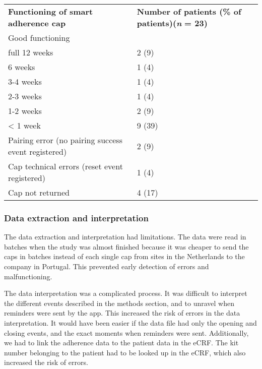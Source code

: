 \documentclass{article}
\begin{document}
\begin{table}

  
\begin{tabular}{l  l}

  \textbf{Functioning of smart adherence cap} & \textbf{Number of patients (\% of patients)}\textbf{(}\emph{\textbf{n}}\textbf{ = 23)}\\
Good functioning & \\
 full 12 weeks &  2 (9)\\
 6 weeks &  1 (4)\\
 3-4 weeks &  1 (4)\\
 2-3 weeks &  1 (4)\\
 1-2 weeks &  2 (9)\\
 < 1 week &  9 (39)\\
Pairing error (no pairing success event registered) &  2 (9)\\
Cap technical errors (reset event registered) &  1 (4)\\
Cap not returned &  4 (17)\\


\end{tabular}


\end{table}


\subsubsection{Data extraction and interpretation}

The data extraction and interpretation had limitations. The data were read in batches when the study was almost finished because it was cheaper to send the caps in batches instead of each single cap from sites in the Netherlands to the company in Portugal. This prevented early detection of errors and malfunctioning. 



The data interpretation was a complicated process. It was difficult to interpret the different events described in the methods section, and to unravel when reminders were sent by the app. This increased the risk of errors in the data interpretation. It would have been easier if the data file had only the opening and closing events, and the exact moments when reminders were sent. Additionally, we had to link the adherence data to the patient data in the eCRF. The kit number belonging to the patient had to be looked up in the eCRF, which also increased the risk of errors. 
\end{document}
